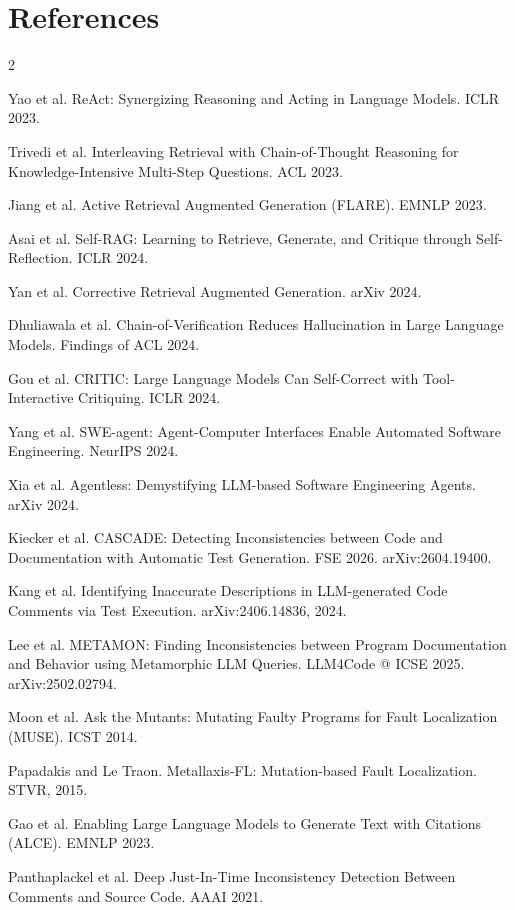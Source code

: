 \documentclass[10pt,a4paper]{article}
\begin{document}
\section*{References}
\begin{multicols}{2}
\footnotesize
\begin{enumerate}[label={[\arabic*]},leftmargin=*,itemsep=1pt]
\item Yao et al. ReAct: Synergizing Reasoning and Acting in Language Models. ICLR 2023.
\item Trivedi et al. Interleaving Retrieval with Chain-of-Thought Reasoning for Knowledge-Intensive Multi-Step Questions. ACL 2023.
\item Jiang et al. Active Retrieval Augmented Generation (FLARE). EMNLP 2023.
\item Asai et al. Self-RAG: Learning to Retrieve, Generate, and Critique through Self-Reflection. ICLR 2024.
\item Yan et al. Corrective Retrieval Augmented Generation. arXiv 2024.
\item Dhuliawala et al. Chain-of-Verification Reduces Hallucination in Large Language Models. Findings of ACL 2024.
\item Gou et al. CRITIC: Large Language Models Can Self-Correct with Tool-Interactive Critiquing. ICLR 2024.
\item Yang et al. SWE-agent: Agent-Computer Interfaces Enable Automated Software Engineering. NeurIPS 2024.
\item Xia et al. Agentless: Demystifying LLM-based Software Engineering Agents. arXiv 2024.
\item Kiecker et al. CASCADE: Detecting Inconsistencies between Code and Documentation with Automatic Test Generation. FSE 2026. arXiv:2604.19400.
\item Kang et al. Identifying Inaccurate Descriptions in LLM-generated Code Comments via Test Execution. arXiv:2406.14836, 2024.
\item Lee et al. METAMON: Finding Inconsistencies between Program Documentation and Behavior using Metamorphic LLM Queries. LLM4Code @ ICSE 2025. arXiv:2502.02794.
\item Moon et al. Ask the Mutants: Mutating Faulty Programs for Fault Localization (MUSE). ICST 2014.
\item Papadakis and Le Traon. Metallaxis-FL: Mutation-based Fault Localization. STVR, 2015.
\item Gao et al. Enabling Large Language Models to Generate Text with Citations (ALCE). EMNLP 2023.
\item Panthaplackel et al. Deep Just-In-Time Inconsistency Detection Between Comments and Source Code. AAAI 2021.

\end{enumerate}
\end{multicols}
\end{document}
